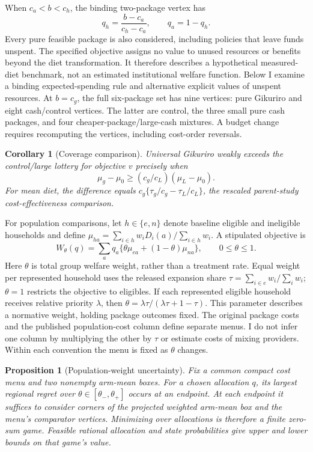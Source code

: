 \documentclass[11pt]{article}
\newtheorem{proposition}{Proposition}
\newtheorem{corollary}{Corollary}
\begin{document}
When $c_a<b<c_h$, the binding two-package vertex has
\begin{equation}
 q_h=\frac{b-c_a}{c_h-c_a},\qquad q_a=1-q_h.\label{eq:mix}
\end{equation}
Every pure feasible package is also considered, including policies that leave funds unspent. The specified objective assigns no value to unused resources or benefits beyond the diet transformation. It therefore describes a hypothetical measured-diet benchmark, not an estimated institutional welfare function. Below I examine a binding expected-spending rule and alternative explicit values of unspent resources. At $b=c_g$, the full six-package set has nine vertices: pure Gikuriro and eight cash/control vertices. The latter are control, the three small pure cash packages, and four cheaper-package/large-cash mixtures. A budget change requires recomputing the vertices, including cost-order reversals.

\begin{corollary}[Coverage comparison]\label{cor:coverage}
Universal Gikuriro weakly exceeds the control/large lottery for objective $v$ precisely when
\[
 \mu_g-\mu_0\geq(c_g/c_L)(\mu_L-\mu_0).
\]
For mean diet, the difference equals $c_g\{\tau_g/c_g-\tau_L/c_L\}$, the rescaled parent-study cost-effectiveness comparison.
\end{corollary}

For population comparisons, let $h\in\{e,n\}$ denote baseline eligible and ineligible households and define $\mu_{ha}=\sum_{i\in h}w_iD_i(a)/\sum_{i\in h}w_i$. A stipulated objective is
\begin{equation}
 W_\theta(q)=\sum_aq_a\{\theta\mu_{ea}+(1-\theta)\mu_{na}\},\qquad 0\leq\theta\leq1.\label{eq:populationobjective}
\end{equation}
Here $\theta$ is total group welfare weight, rather than a treatment rate. Equal weight per represented household uses the released expansion share $\tau=\sum_{i\in e}w_i/\sum_iw_i$; $\theta=1$ restricts the objective to eligibles. If each represented eligible household receives relative priority $\lambda$, then $\theta=\lambda\tau/(\lambda\tau+1-\tau)$. This parameter describes a normative weight, holding package outcomes fixed. The original package costs and the published population-cost column define separate menus. I do not infer one column by multiplying the other by $\tau$ or estimate costs of mixing providers. Within each convention the menu is fixed as $\theta$ changes.

\begin{proposition}[Population-weight uncertainty]\label{prop:population}
Fix a common compact cost menu and two nonempty arm-mean boxes. For a chosen allocation $q$, its largest regional regret over $\theta\in[\theta_-,\theta_+]$ occurs at an endpoint. At each endpoint it suffices to consider corners of the projected weighted arm-mean box and the menu's comparator vertices. Minimizing over allocations is therefore a finite zero-sum game. Feasible rational allocation and state probabilities give upper and lower bounds on that game's value.
\end{proposition}
\end{document}
